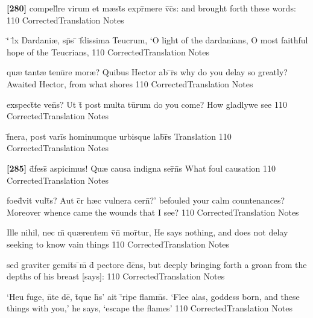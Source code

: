 \latline
  {\textbf{[280]} compell\={}re virum et m{\ae}st\={}s expr\={}mere v\={}c\={}s:}
  { and brought forth these words: }
  {110}
  { CorrectedTranslation }
  { Notes }


\latline
  {`\={} l\={}x Dardani{\ae}, sp\={}s \={} f\={\macron {\i}}dissima Teucrum,}
  { `O light of the dardanians, O most faithful hope of the Teucrians, }
  {110}
  { CorrectedTranslation }
  { Notes }


\latline
  {qu{\ae} tant{\ae} tenu\={}re mor{\ae}?  Quibus Hector ab \={}r\={\macron {\i}}s}
  { why do you delay so greatly?  Awaited Hector, from what shores }
  {110}
  { CorrectedTranslation }
  { Notes }


\latline
  {exspect\={}te ven\={\macron {\i}}s?  Ut t\={} post multa tu\={}rum}
  { do you come?  How gladlywe see }
  {110}
  { CorrectedTranslation }
  { Notes }


\latline
  {f\={}nera, post vari\={}s hominumque urbisque lab\={}r\={}s}
  { Translation }
  {110}
  { CorrectedTranslation }
  { Notes }


\latline
  {\textbf{[285]} d\={}fess\={\macron {\i}}  aspicimus!  Qu{\ae} causa indigna ser\={}n\={}s}
  { What foul causation  }
  {110}
  { CorrectedTranslation }
  { Notes }


\latline
  {foed\={}vit vult\={}s?  Aut c\={}r h{\ae}c vulnera cern\={}?'}
  { befouled your calm countenances?  Moreover whence came the wounds that I see? }
  {110}
  { CorrectedTranslation }
  { Notes }


\latline
  {Ille nihil, nec m\={} qu{\ae}rentem v\={}n\={} mor\={}tur,}
  { He says nothing, and does not delay seeking to know vain things }
  {110}
  { CorrectedTranslation }
  { Notes }


\latline
  {sed graviter gemit\={}s \={\macron {\i}}m\={} d\={} pectore d\={}c\={}ns,}
  { but deeply bringing forth a groan from the depths of his breast [says]: }
  {110}
  { CorrectedTranslation }
  { Notes }


\latline
  {`Heu fuge, n\={}te de\={}, t\={}que h\={\macron {\i}}s' ait `\={}ripe flamm\={\macron {\i}}s.}
  { `Flee alas, goddess born, and these things with you,' he says, `escape the flames' }
  {110}
  { CorrectedTranslation }
  { Notes }


